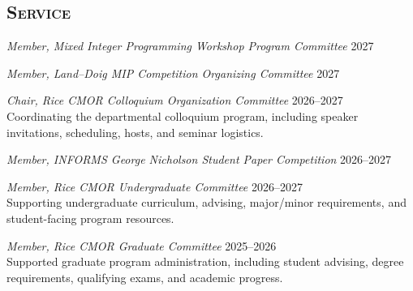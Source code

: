 \documentclass[margin,line,pifont]{./FontsAndCls/custom_res}
\begin{document}
\begin{resume}
\begin{minipage}{\textwidth}
\section{ \bfseries\scshape Service}

\noindent \begin{minipage} {\textwidth}
\textit{Member, Mixed Integer Programming Workshop Program Committee} \hfill 2027 \\
\end{minipage}
\vspace{0.4em}

\noindent \begin{minipage} {\textwidth}
	\textit{Member, Land--Doig MIP Competition Organizing Committee} \hfill 2027
\end{minipage}
\vspace{0.4em}

\noindent \begin{minipage} {\textwidth}
\textit{Chair, Rice CMOR Colloquium Organization Committee} \hfill 2026--2027 \\
Coordinating the departmental colloquium program, including speaker invitations, scheduling, hosts, and seminar logistics.
\end{minipage}
\vspace{0.4em}

\noindent \begin{minipage} {\textwidth}
\textit{Member, INFORMS George Nicholson Student Paper Competition} \hfill 2026--2027
\end{minipage}
\vspace{0.4em}

\noindent \begin{minipage} {\textwidth}
\textit{Member, Rice CMOR Undergraduate Committee} \hfill 2026--2027 \\
Supporting undergraduate curriculum, advising, major/minor requirements, and student-facing program resources.
\end{minipage}
\vspace{0.4em}

\noindent \begin{minipage} {\textwidth}
\textit{Member, Rice CMOR Graduate Committee} \hfill 2025--2026 \\
Supported graduate program administration, including student advising, degree requirements, qualifying exams, and academic progress.
\end{minipage}
\vspace{0.4em}


\end{minipage}
\end{resume}
\end{document}
